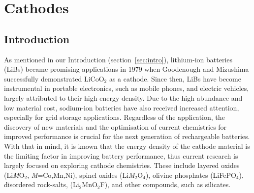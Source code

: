 \documentclass[../main.tex]{subfiles}
\begin{document}
\section{Cathodes}
\label{sec:cathodes}

\subsection{Introduction}
\label{sec:cathode_intro}
As mentioned in our Introduction (section~\ref{sec:intro}), lithium-ion batteries (LiBs) became promising applications in 1979 when Goodenough and Mizushima successfully demonstrated LiCoO$_2$ as a cathode.\cite{mizushima1980lixcoo2} Since then, LiBs have become instrumental in portable electronics, such as mobile phones, and electric vehicles, \cite{rozier2015li, whittingham2008materials, dunn2011electrical, liu2013materials,palacin2009recent} largely attributed to their high energy density. \cite{masquelier2013polyanionic,armand2008building,bruce2012li,park2010review,scrosati2011lithium,goodenough_li-ion_2013,etacheri2011challenges,takada2013progress,fergus2010recent,ellis2010positive,he2012layered,zaghib2013review} Due to the high abundance and low material cost, sodium-ion batteries have also received increased attention, especially for grid storage applications. \cite{ellis2012curr,kim2012electrode,palomares2012ion,fergus2012ion,yabuuchi2012p2} Regardless of the application, the discovery of new materials and the optimisation of current chemistries for improved performance is crucial for the next generation of rechargeable batteries. With that in mind, it is known that the energy density of the cathode material is the limiting factor in improving battery performance, thus current research is largely focused on exploring cathode chemistries. These include layered oxides (Li\textit{M}O$_2$, \textit{M}=Co,Mn,Ni), spinel oxides (Li\textit{M}$_2$O$_4$), olivine phosphates (LiFePO$_4$), disordered rock-salts, (Li$_2$MnO$_2$F), and other compounds, such as silicates. \cite{daniel2014cathode, islam2014lithium}
\end{document}
